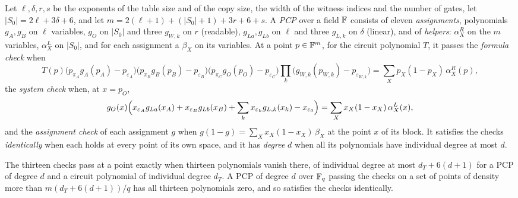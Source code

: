 \begin{definition}
\label{def:ar-pcp}
\leanok
Let $\ell, \delta, r, s$ be the exponents of the table size and of the copy size, the width of
the witness indices and the number of gates, let $|S_0| = 2\ell + 3\delta + 6$, and let
$m = 2(\ell + 1) + (|S_0| + 1) + 3r + 6 + s$. A \emph{PCP} over a field $\mathbb{F}$ consists of eleven
\emph{assignments}, polynomials $g_A, g_B$ on $\ell$ variables, $g_O$ on $|S_0|$ and three
$g_{W,k}$ on $r$ (readable), $g_{La}, g_{Lb}$ on $\ell$ and three $g_{L,k}$ on $\delta$ (linear),
and of \emph{helpers}: $\alpha^R_X$ on the $m$ variables, $\alpha^L_X$ on $|S_0|$, and for each
assignment a $\beta_X$ on its variables. At a point $p \in \mathbb{F}^m$, for the circuit polynomial $T$,
it passes the \emph{formula check} when
\[
T(p) \bigl(p_{\pi_A} g_A(p_A) - p_{\varepsilon_A}\bigr)
\bigl(p_{\pi_B} g_B(p_B) - p_{\varepsilon_B}\bigr)
\bigl(p_{\pi_C} g_O(p_O) - p_{\varepsilon_C}\bigr)
\prod_{k} \bigl(g_{W,k}(p_{W,k}) - p_{\varepsilon_{W,k}}\bigr)
= \sum_X p_X (1 - p_X)\, \alpha^R_X(p),
\]
the \emph{system check} when, at $x = p_O$,
\[
g_O(x) \Bigl(x_{\varepsilon_A} g_{La}(x_A) + x_{\varepsilon_B} g_{Lb}(x_B)
+ \sum_k x_{\varepsilon_k} g_{L,k}(x_k) - x_{\varepsilon_0}\Bigr)
= \sum_X x_X (1 - x_X)\, \alpha^L_X(x),
\]
and the \emph{assignment check} of each assignment $g$ when $g(1 - g) = \sum_X x_X (1 - x_X)\,
\beta_X$ at the point $x$ of its block. It satisfies the checks \emph{identically} when each holds
at every point of its own space, and it has \emph{degree} $d$ when all its polynomials have
individual degree at most $d$.
\end{definition}

\begin{lemma}
\label{lem:ar-pcp-schwartz-zippel}
\leanok
The thirteen checks pass at a point exactly when thirteen polynomials vanish there, of individual
degree at most $d_T + 6(d + 1)$ for a PCP of degree $d$ and a circuit polynomial of individual
degree $d_T$. A PCP of degree $d$ over $\mathbb{F}_q$ passing the checks on a set of points of density
more than $m (d_T + 6(d + 1))/q$ has all thirteen polynomials zero, and so satisfies the checks
identically.
\end{lemma}

